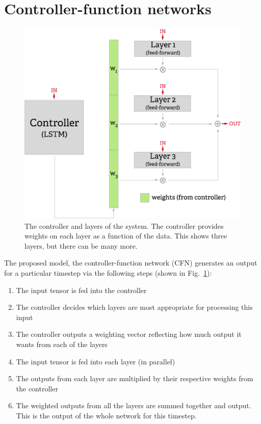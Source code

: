 \documentclass[12pt,twoside]{mitthesis}
\providecommand{\tightlist}{%
  \setlength{\itemsep}{0pt}\setlength{\parskip}{0pt}}
\begin{document}
\section{Controller-function
networks}\label{controller-function-networks}

\begin{figure}[htbp]
\centering
\includegraphics{controller_network_small.png}
\caption{\label{fig:controller_network}The controller and layers of the
system. The controller provides weights on each layer as a function of
the data. This shows three layers, but there can be many more.}
\end{figure}

The proposed model, the controller-function network (CFN) generates an
output for a particular timestep via the following steps (shown in
Fig.~\ref{fig:controller_network}):

\begin{enumerate}
\def\labelenumi{\arabic{enumi}.}
\tightlist
\item
  The input tensor is fed into the controller
\item
  The controller decides which layers are most appropriate for
  processing this input
\item
  The controller outputs a weighting vector reflecting how much output
  it wants from each of the layers
\item
  The input tensor is fed into each layer (in parallel)
\item
  The outputs from each layer are multiplied by their respective weights
  from the controller
\item
  The weighted outputs from all the layers are summed together and
  output. This is the output of the whole network for this timestep.
\end{enumerate}
\end{document}
